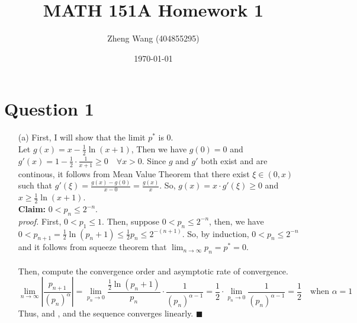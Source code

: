 \documentclass[11pt]{article}
\author{Zheng Wang (404855295)}
\date{\today}
\title{MATH 151A Homework 1}
\newcommand*{\boxtex}[1]{\framebox{#1}}
\begin{document}
\maketitle

\section*{Question 1}
\begin{itemize}
	\item [(a)]
	First, I will show that the limit $ p^* $ is $ 0 $.\\
	Let $ g(x) = x - \frac{1}{2}\ln(x+1) $, Then we have $ g(0) = 0 $ and $ g'(x)= 1-\frac{1}{2}\cdot \frac{1}{x+1} \ge 0 \quad \forall x > 0 $. Since $ g $ and $ g' $ both exist and are continous, it follows from Mean Value Theorem that there exist $ \xi \in (0,x) $ such that $ g'(\xi) = \frac{g(x)-g(0)}{x-0} = \frac{g(x)}{x}$.
	So, $g(x) = x\cdot g'(\xi) \ge 0 $ and $ x \ge \frac{1}{2}\ln (x+1) $.\\
	\textbf{Claim:} $ 0 < p_n \le 2^{-n} $.\\
	\textit{proof.} First, $ 0 < p_1 \le 1 $. Then, suppose $ 0 < p_n \le 2^{-n} $, then, we have $ 0 < p_{n+1} = \frac{1}{2}\ln(p_n+1) \le \frac{1}{2}p_n \le 2^{-(n+1)} $. So, by induction, $ 0 < p_n \le 2^{-n} $ and it follows from squeeze theorem that $ \lim_{n \rightarrow \infty} p_n = p^* = 0 $.\\\\
	Then, compute the convergence order and asymptotic rate of convergence. 
	\[ \lim_{n\rightarrow \infty} \left| \frac{p_{n+1}}{(p_n)^\alpha} \right| = \lim_{p_n \rightarrow 0} \frac{\frac{1}{2}\ln(p_n + 1)}{p_n} \cdot \frac{1}{(p_n)^{\alpha -1}} = \frac{1}{2} \cdot \lim_{p_n \rightarrow 0} \frac{1}{(p_n)^{\alpha -1}} = \frac{1}{2} \quad\text{when } \alpha = 1 \]
	Thus, \boxtex{$ \alpha = 1 $} and \boxtex{$ \lambda = \frac{1}{2} $}, and the sequence converges linearly. \hfill $ \blacksquare $
	

\end{itemize}
\end{document}
